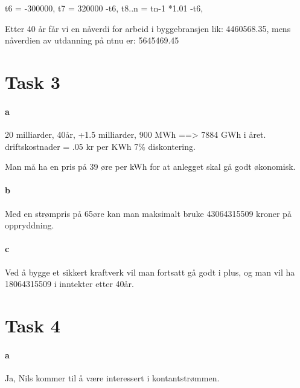 \documentclass[12pt, a4paper]{article}
\begin{document}
t6 = -300000,
t7 = 320000 -t6,
t8..n = tn-1 *1.01 -t6,

Etter 40 år får vi en nåverdi for arbeid i byggebransjen lik: 4460568.35, mens
nåverdien av utdanning på ntnu er: 5645469.45

\section{Task 3}
\paragraph{a}
20 milliarder, 40år, +1.5 milliarder, 
900 MWh ==> 7884 GWh i året. 
driftskostnader = .05 kr per KWh
7\% diskontering.

Man må ha en pris på 39 øre per kWh for at anlegget skal gå godt økonomisk. 

\paragraph{b}
Med en strømpris på 65øre kan man maksimalt bruke 43064315509 kroner på
oppryddning.

\paragraph{c}
Ved å bygge et sikkert kraftverk vil man fortsatt gå godt i plus, og man vil ha
18064315509 i inntekter etter 40år. 

\section{Task 4}
\paragraph{a}
Ja, Nils kommer til å være interessert i kontantstrømmen.
\end{document}
